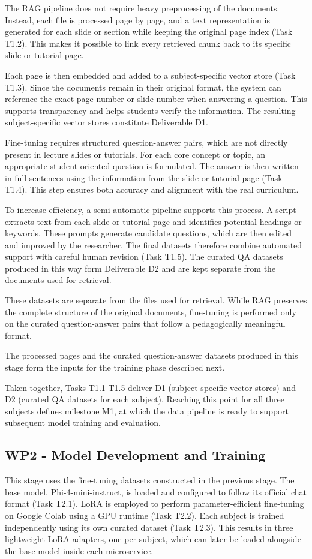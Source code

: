 The RAG pipeline does not require heavy preprocessing of the documents. Instead, each file is processed page by page, and a text representation is generated for each slide or section while keeping the original page index (Task T1.2). This makes it possible to link every retrieved chunk back to its specific slide or tutorial page.

Each page is then embedded and added to a subject-specific vector store (Task T1.3). Since the documents remain in their original format, the system can reference the exact page number or slide number when answering a question. This supports transparency and helps students verify the information. The resulting subject-specific vector stores constitute Deliverable D1.

Fine-tuning requires structured question-answer pairs, which are not directly present in lecture slides or tutorials. For each core concept or topic, an appropriate student-oriented question is formulated. The answer is then written in full sentences using the information from the slide or tutorial page (Task T1.4). This step ensures both accuracy and alignment with the real curriculum.

To increase efficiency, a semi-automatic pipeline supports this process. A script extracts text from each slide or tutorial page and identifies potential headings or keywords. These prompts generate candidate questions, which are then edited and improved by the researcher. The final datasets therefore combine automated support with careful human revision (Task T1.5). The curated QA datasets produced in this way form Deliverable D2 and are kept separate from the documents used for retrieval.

These datasets are separate from the files used for retrieval. While RAG preserves the complete structure of the original documents, fine-tuning is performed only on the curated question-answer pairs that follow a pedagogically meaningful format.

The processed pages and the curated question-answer datasets produced in this stage form the inputs for the training phase described next.

Taken together, Tasks T1.1-T1.5 deliver D1 (subject-specific vector stores) and D2 (curated QA datasets for each subject). Reaching this point for all three subjects defines milestone M1, at which the data pipeline is ready to support subsequent model training and evaluation.

\subsection{WP2 - Model Development and Training}
This stage uses the fine-tuning datasets constructed in the previous stage. The base model, Phi-4-mini-instruct, is loaded and configured to follow its official chat format (Task T2.1). LoRA is employed to perform parameter-efficient fine-tuning on Google Colab using a GPU runtime (Task T2.2). Each subject is trained independently using its own curated dataset (Task T2.3). This results in three lightweight LoRA adapters, one per subject, which can later be loaded alongside the base model inside each microservice.


